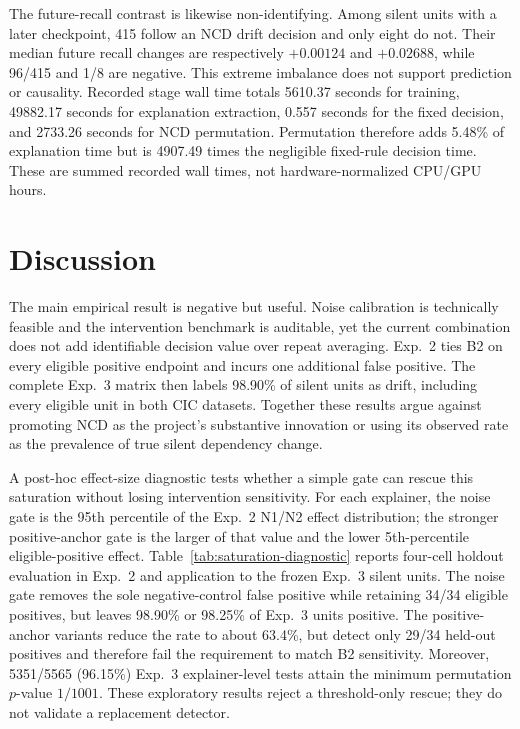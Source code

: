 \documentclass[10pt]{article}
\newcommand{\ncd}{\textsc{NCD}}
\begin{document}
The future-recall contrast is likewise non-identifying.  Among silent units
with a later checkpoint, 415 follow an \ncd{} drift decision and only eight do
not.  Their median future recall changes are respectively $+0.00124$ and
$+0.02688$, while 96/415 and 1/8 are negative.  This extreme imbalance does
not support prediction or causality.  Recorded stage wall time totals 5610.37
seconds for training, 49882.17 seconds for explanation extraction, 0.557
seconds for the fixed decision, and 2733.26 seconds for NCD permutation.
Permutation therefore adds 5.48\% of explanation time but is 4907.49 times the
negligible fixed-rule decision time.  These are summed recorded wall times, not
hardware-normalized CPU/GPU hours.

\section{Discussion}

The main empirical result is negative but useful.  Noise calibration is
technically feasible and the intervention benchmark is auditable, yet the
current combination does not add identifiable decision value over repeat
averaging.  Exp.~2 ties B2 on every eligible positive endpoint and incurs one
additional false positive.  The complete Exp.~3 matrix then labels 98.90\% of
silent units as drift, including every eligible unit in both CIC datasets.
Together these results argue against promoting \ncd{} as the project's
substantive innovation or using its observed rate as the prevalence of true
silent dependency change.

A post-hoc effect-size diagnostic tests whether a simple gate can rescue this
saturation without losing intervention sensitivity.  For each explainer, the
noise gate is the 95th percentile of the Exp.~2 N1/N2 effect distribution;
the stronger positive-anchor gate is the larger of that value and the lower
5th-percentile eligible-positive effect.  Table~\ref{tab:saturation-diagnostic}
reports four-cell holdout evaluation in Exp.~2 and application to the frozen
Exp.~3 silent units.  The noise gate removes the sole negative-control false
positive while retaining 34/34 eligible positives, but leaves 98.90\% or
98.25\% of Exp.~3 units positive.  The positive-anchor variants reduce the
rate to about 63.4\%, but detect only 29/34 held-out positives and therefore
fail the requirement to match B2 sensitivity.  Moreover, 5351/5565 (96.15\%)
Exp.~3 explainer-level tests attain the minimum permutation $p$-value
$1/1001$.  These exploratory results reject a threshold-only rescue; they do
not validate a replacement detector.
\end{document}
